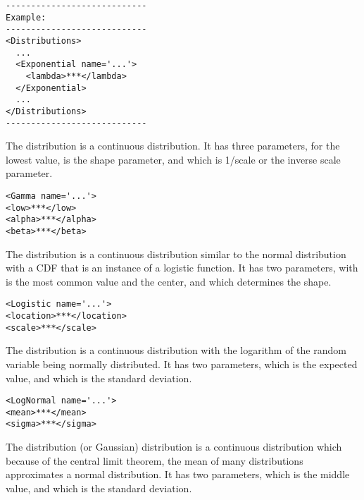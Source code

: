 \begin{lstlisting}[style=XML]
----------------------------
Example:
----------------------------
<Distributions>
  ...
  <Exponential name='...'>
    <lambda>***</lambda>
  </Exponential>
  ...
</Distributions>
----------------------------
\end{lstlisting}




 The  distribution is a continuous distribution.  It
has three parameters,  for the lowest value,
 is the shape parameter, and  which
is 1/scale or the inverse scale parameter.

\begin{lstlisting}[style=XML]
<Gamma name='...'>
<low>***</low>
<alpha>***</alpha>
<beta>***</beta>
\end{lstlisting}


The  distribution is a continuous distribution
similar to the normal distribution with a CDF that is an instance of a
logistic function.  It has two parameters,  with
is the most common value and the center, and  which
determines the shape.

\begin{lstlisting}[style=XML]
<Logistic name='...'>
<location>***</location>
<scale>***</scale>
\end{lstlisting}


The  distribution is a continuous distribution
with the logarithm of the random variable being normally distributed.
It has two parameters,  which is the expected value,
and  which is the standard deviation.

\begin{lstlisting}[style=XML]
<LogNormal name='...'>
<mean>***</mean>
<sigma>***</sigma>
\end{lstlisting}


The  distribution (or Gaussian) distribution is a
continuous distribution which because of the central limit theorem,
the mean of many distributions approximates a normal distribution.  It
has two parameters,  which is the middle value, and
 which is the standard deviation.

